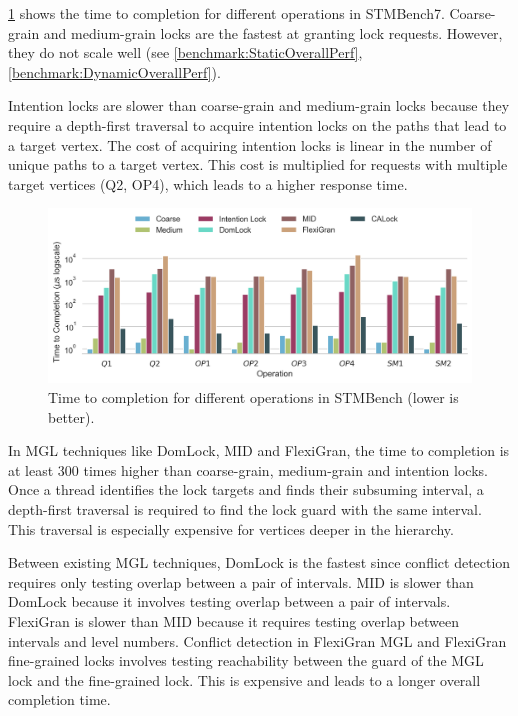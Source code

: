 \cref{ttc} shows the time to completion for different operations in STMBench7. 
Coarse-grain and medium-grain locks are the fastest at granting lock requests. However, they do not scale well (see \cref{benchmark:StaticOverallPerf}, \cref{benchmark:DynamicOverallPerf}). 

Intention locks are slower than coarse-grain and medium-grain locks because they require a depth-first traversal to acquire intention locks on the paths that lead to a target vertex. The cost of acquiring intention locks is linear in the number of unique paths to a target vertex. This cost is multiplied for requests with multiple target vertices (Q2, OP4), which leads to a higher response time. 

\begin{figure}[h]
	\captionsetup{justification=centering}
	\centering
	\includegraphics[width=\columnwidth]{figures/PerformanceCharts/TTC}
	\caption{Time to completion for different operations in STMBench (lower is better).}
	\label{ttc}
\end{figure}

In MGL techniques like DomLock, MID and FlexiGran, the time to completion is at least 300 times higher than coarse-grain, medium-grain and intention locks. Once a thread identifies the lock targets and finds their subsuming interval, a depth-first traversal is required to find the lock guard with the same interval. This traversal is especially expensive for vertices deeper in the hierarchy.


Between existing MGL techniques, DomLock is the fastest since conflict detection requires only testing overlap between a pair of intervals. MID is slower than DomLock because it involves testing overlap between a pair of intervals. FlexiGran is slower than MID because it requires testing overlap between intervals and level numbers. Conflict detection in FlexiGran MGL and FlexiGran fine-grained locks involves testing reachability between the guard of the MGL lock and the fine-grained lock. This is expensive and leads to a longer overall completion time.

